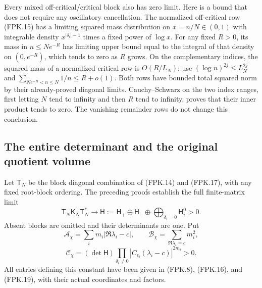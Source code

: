 \documentclass[11pt,a4paper]{article}
\begin{document}
Every mixed off-critical/critical block also has zero limit. Here
is a bound that does not require any oscillatory cancellation.
The normalized off-critical row (FPK.15) has a limiting squared
mass distribution on $x=n/N\in(0,1)$ with integrable density
$x^{|\delta_i|-1}$ times a fixed power of $\log x$.
For any fixed $R>0$, its mass in $n\leq Ne^{-R}$ has limiting
upper bound equal to the integral of that density on $(0,e^{-R})$,
which tends to zero as $R$ grows. On the complementary indices,
the squared mass of a normalized critical row is $O(R/L_N)$:
use $(\log n)^{2j}\leq L_N^{2j}$ and
$\sum_{Ne^{-R}<n\leq N}1/n\leq R+o(1)$.
Both rows have bounded total squared norm by their already-proved
diagonal limits. Cauchy--Schwarz on the two index ranges, first
letting $N$ tend to infinity and then $R$ tend to infinity, proves
that their inner product tends to zero. The vanishing remainder
rows do not change this conclusion.

\subsection{The entire determinant and the original quotient volume}

Let $\mathsf T_N$ be the block diagonal combination of
(FPK.14) and (FPK.17), with any fixed root-block ordering. The
preceding proofs establish the full finite-matrix limit
\[
 \mathsf T_N\mathsf K_N\mathsf T_N^*
    \longrightarrow
 \mathsf H:=\mathsf H_+\oplus\mathsf H_-
          \oplus\bigoplus_{\delta_i=0}\mathsf H_i^0>0.
 \tag{FPK.20}
\]
Absent blocks are omitted and their determinants are one. Put
\[
 \mathcal A_\chi=\sum_i m_i|\Re\lambda_i-c|,
 \qquad \mathcal B_\chi=\sum_{\Re\lambda_i=c}m_i^2,
 \tag{FPK.21}
\]
\[
 \mathcal C_\chi
  =(\det\mathsf H)
     \prod_{\delta_i\ne0}|C_{\epsilon_i}(\lambda_i-c)|^{2m_i}>0.
 \tag{FPK.22}
\]
All entries defining this constant have been given in (FPK.8),
(FPK.16), and (FPK.19), with their actual coordinates and factors.
\end{document}
